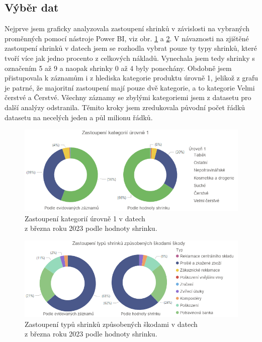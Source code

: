 
\subsection{Výběr dat}

Nejprve jsem graficky analyzovala zastoupení shrinků v závislosti na vybraných proměnných pomocí nástroje Power BI, viz obr. \ref*{obr:rok:g:zastoupeni1} a \ref*{obr:rok:g:zastoupenish1}. V návaznosti na zjištěné zastoupení shrinků v datech jsem se rozhodla vybrat pouze ty typy shrinků, které tvoří více jak jedno procento z celkových nákladů. Vynechala jsem tedy shrinky s označením 5 až 9 a naopak shrinky 0 až 4 byly ponechány. Obdobně jsem přistupovala k záznamům i z hlediska kategorie produktu úrovně 1, jelikož z grafu je patrné, že majoritní zastoupení mají pouze dvě kategorie, a to kategorie Velmi čerstvé a Čerstvé. Všechny záznamy se zbylými kategoriemi jsem z datasetu pro další analýzy odstranila. Těmito kroky jsem zredukovala původní počet řádků datasetu na necelých jeden a půl milionu řádků.

\begin{figure}[hbtp!]
    \centering
    \captionsetup{justification=centering}
    \includegraphics[width=\textwidth]{obrazky/grafy/zastoupeniL1.png}
    \caption{Zastoupení kategorií úrovně 1 v datech \\ z března roku 2023 podle hodnoty shrinku.}
    \label{obr:rok:g:zastoupeni1}
\end{figure}

\begin{figure}[hbtp!]
    \centering
    \captionsetup{justification=centering}
    \includegraphics[width=\textwidth]{obrazky/grafy/zastoupenishrinky.png}
    \caption{Zastoupení typů shrinků způsobených škodami v datech \\ z března roku 2023 podle hodnoty shrinku.}
    \label{obr:rok:g:zastoupenish1}
\end{figure}


